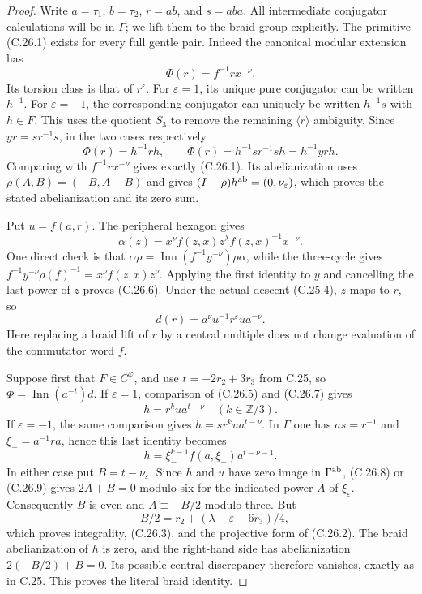 \begin{proof}
Write $a=\tau_1$, $b=\tau_2$, $r=ab$, and $s=aba$.
All intermediate conjugator calculations will be in
$\Gamma$; we lift them to the braid group explicitly.
The primitive (C.26.1) exists for every full gentle
pair. Indeed the canonical modular extension has
\[
                    \Phi(r)=f^{-1}r x^{-\nu}.
\]
Its torsion class is that of $r^\varepsilon$.
For $\varepsilon=1$, its unique pure conjugator
can be written $h^{-1}$. For $\varepsilon=-1$,
the corresponding conjugator can uniquely be
written $h^{-1}s$ with $h\in F$.
This uses the quotient $S_3$ to remove the
remaining $\langle r\rangle$ ambiguity. Since
$yr=sr^{-1}s$, in the two cases respectively
\[
 \Phi(r)=h^{-1}rh,\qquad
 \Phi(r)=h^{-1}sr^{-1}sh=h^{-1}yrh.
 \tag{C.26.5}
\]
Comparing with $f^{-1}rx^{-\nu}$ gives exactly
(C.26.1). Its abelianization uses
$\rho(A,B)=(-B,A-B)$ and gives
$(I-\rho)h^{\rm ab}=(0,\nu_\varepsilon)$,
which proves the stated abelianization and its
zero sum.

Put $u=f(a,r)$. The peripheral hexagon gives
\[
 \alpha(z)=x^\nu f(z,x)z^\lambda f(z,x)^{-1}x^{-\nu}.
 \tag{C.26.6}
\]
One direct check is that
$\alpha\rho=\operatorname{Inn}(f^{-1}y^{-\nu})\rho\alpha$,
while the three-cycle gives
$f^{-1}y^{-\nu}\rho(f)^{-1}=x^\nu f(z,x)z^\nu$.
Applying the first identity to $y$ and cancelling
the last power of $z$ proves (C.26.6).
Under the actual descent (C.25.4), $z$ maps to
$r$, so
\[
                   d(r)=a^\nu u^{-1}r^\varepsilon u a^{-\nu}.
 \tag{C.26.7}
\]
Here replacing a braid lift of $r$ by a central
multiple does not change evaluation of the
commutator word $f$.

Suppose first that $F\in C^\varphi$, and use
$t=-2r_2+3r_3$ from C.25, so
$\Phi=\operatorname{Inn}(a^{-t})d$.
If $\varepsilon=1$, comparison of (C.26.5)
and (C.26.7) gives
\[
                      h=r^k u a^{t-\nu}
                         \quad(k\in\mathbb Z/3).
 \tag{C.26.8}
\]
If $\varepsilon=-1$, the same comparison gives
$h=s r^k u a^{t-\nu}$. In $\Gamma$ one has
$as=r^{-1}$ and $\xi_-=a^{-1}ra$, hence this
last identity becomes
\[
              h=\xi_-^{k-1}f(a,\xi_-)
                                  a^{t-\nu-1}.
 \tag{C.26.9}
\]
In either case put $B=t-\nu_\varepsilon$.
Since $h$ and $u$ have zero image in
$\Gamma^{\rm ab}$, (C.26.8) or (C.26.9)
gives $2A+B=0$ modulo six for the indicated
power $A$ of $\xi_\varepsilon$.
Consequently $B$ is even and
$A\equiv-B/2$ modulo three.
But
\[
 -B/2=r_2+(\lambda-\varepsilon-6r_3)/4,
\]
which proves integrality, (C.26.3), and the
projective form of (C.26.2).
The braid abelianization of $h$ is zero,
and the right-hand side has abelianization
$2(-B/2)+B=0$. Its possible central discrepancy
therefore vanishes, exactly as in C.25.
This proves the literal braid identity.


\end{proof}
